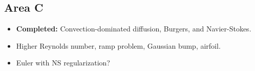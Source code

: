 \documentclass{report}
\begin{document}
\subsection{Area C}

\begin{itemize}
\item{\textbf{Completed: }} Convection-dominated diffusion, Burgers, and Navier-Stokes. 
\item Higher Reynolds number, ramp problem, Gaussian bump, airfoil.
\item Euler with NS regularization?
\end{itemize}




\appendix

\end{document}
